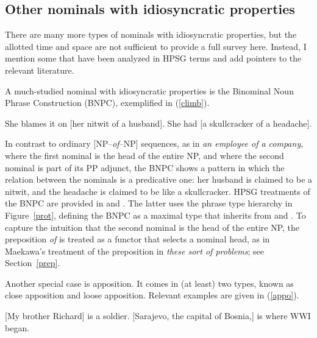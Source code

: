 \documentclass[output=paper
	        ,collection
	        ,collectionchapter
 	        ,biblatex
                ,babelshorthands
                ,newtxmath
                ,draftmode
                ,colorlinks, citecolor=brown
]{langscibook}
\begin{document}
\subsection{Other nominals with idiosyncratic properties} 
\label{other}


There are many more types of nominals with idiosyncratic properties,
but the allotted time and space are not sufficient to provide a full survey here. 
Instead, I mention some that have been analyzed in HPSG terms and add pointers 
to the relevant literature.    

A much-studied nominal with idiosyncratic properties is the Binominal Noun Phrase 
Construction (BNPC), exemplified in (\ref{climb}). 

\begin{exe}
\ex\label{climb}
\begin{xlist}
\ex  She blames it on [her nitwit of a husband]. 
\ex  She had [a skullcracker of a headache]. 
\end{xlist}
\end{exe}

\noindent
In contrast to ordinary [NP--\emph{of}--NP] sequences, 
as in \emph{an employee of a  company}, where the 
first nominal is the head of the entire NP, and where the second 
nominal is part of its PP adjunct, the BNPC shows a pattern
in which the relation between the nominals is a predicative one: 
her husband is claimed to be a nitwit, and the headache is claimed to be 
like a skullcracker. HPSG treatments of the BNPC are provided in
\citet{KimSells14} and \citet{VanEynde18}. The latter uses 
the phrase type hierarchy in Figure~\ref{prot}, defining the BNPC as 
a maximal type that inherits from  and 
. To capture the intuition that the second
nominal is the head of the entire NP, the preposition \emph{of} is 
treated as a functor that selects a nominal head, as in Maekawa's treatment of 
the preposition in \emph{these sort of problems}; see Section~\ref{prep}. 

Another special case is apposition. It comes in (at least) two types, known as 
close apposition and loose apposition. Relevant examples are given in (\ref{appo}). 

\begin{exe} 
\ex\label{appo} 
\begin{xlist} 
\ex  {}[My brother Richard] is a soldier.  
\ex  {}[Sarajevo, the capital of Bosnia,] is where WWI began.
\end{xlist} 
\end{exe}
\end{document}
